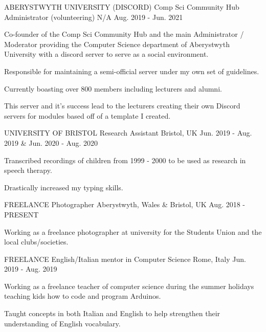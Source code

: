 \begin{cventries}
  \cventry
    {ABERYSTWYTH UNIVERSITY (DISCORD)} %
    {Comp Sci Community Hub Administrator (volunteering)} %
    {N/A} %
    {Aug. 2019 - Jun. 2021} %
    {
      \begin{cvitems} %
        \item {Co-founder of the Comp Sci Community Hub and the main Administrator / Moderator providing the Computer Science department of Aberystwyth University with a discord server to serve as a social environment.}
        \item {Responsible for maintaining a semi-official server under my own set of guidelines.}
        \item {Currently boasting over 800 members including lecturers and alumni.}
        \item {This server and it's success lead to the lecturers creating their own Discord servers for modules based off of a template I created.}
      \end{cvitems}
    }
    
  \cventry
    {UNIVERSITY OF BRISTOL} %
    {Research Assistant} %
    {Bristol, UK} %
    {Jun. 2019 - Aug. 2019 \& Jun. 2020 - Aug. 2020} %
    {
      \begin{cvitems} %
        \item {Transcribed recordings of children from 1999 - 2000 to be used as research in speech therapy.}
        \item {Drastically increased my typing skills.}
      \end{cvitems}
    }
    
  \cventry
    {FREELANCE} %
    {Photographer} %
    {Aberystwyth, Wales \& Bristol, UK} %
    {Aug. 2018 - PRESENT} %
    {
      \begin{cvitems} %
        \item {Working as a freelance photographer at university for the Students Union and the local clubs\slash  societies.}
      \end{cvitems}
    }

  \cventry
    {FREELANCE} %
    {English/Italian mentor in Computer Science} %
    {Rome, Italy} %
    {Jun. 2019 - Aug. 2019} %
    {
      \begin{cvitems} %
        \item {Working as a freelance teacher of computer science during the summer holidays teaching kids how to code and program Arduinos.}
        \item {Taught concepts in both Italian and English to help strengthen their understanding of English vocabulary.}
      \end{cvitems}
    }

\end{cventries}
